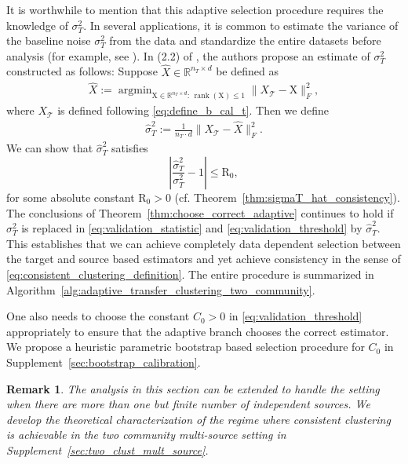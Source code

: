 \documentclass[10pt]{article}
\newtheorem{remark}{Remark}
\newcommand{\R}{\mathbb R}
\newcommand{\wh}{\widehat}
\DeclareMathOperator{\argmin}{\arg\min}
\newcommand{\calT}{\mathcal T}
\newcommand{\trg}{T}
\newcommand{\nT}{n_{\trg}}
\newcommand{\sigmaT}{\sigma_{\trg}}
\begin{document}
It is worthwhile to mention that this adaptive selection procedure requires the knowledge of $\sigmaT^2$. In several applications, it is common to estimate the variance of the baseline noise $\sigmaT^2$ from the data and standardize the entire datasets before analysis (for example, see \cite{zhong2022empirical}). In (2.2) of \citet{zhong2022empirical}, the authors propose an estimate of $\sigmaT^2$ constructed as follows: Suppose $\wh{X} \in \R^{\nT \times d}$ be defined as
\begin{align}
    \wh{X}:=\argmin_{\mathrm X \in \R^{\nT \times d}:\,\operatorname{rank}(\mathrm X) \le 1}\|X_\calT-\mathrm X\|^2_F,
\end{align}
where $X_\calT$ is defined following \eqref{eq:define_b_cal_t}. Then we define
\begin{align}
\label{eq:consistent_plug_in}
        \wh \sigma^2_T:=\frac{1}{\nT \cdot d}\|X_\calT-\wh{X}\|^2_F.
\end{align}
We can show that $\wh \sigma^2_T$ satisfies
\begin{equation}
\label{eq:consistency_sigma}
    \left|\frac{\wh \sigma^2_T}{\sigmaT^2}-1\right| \le \mathrm R_0,
\end{equation}
for some absolute constant $\mathrm R_0>0$ (cf. Theorem~\ref{thm:sigmaT_hat_consistency}). The conclusions of Theorem~\ref{thm:choose_correct_adaptive} continues to hold if $\sigmaT^2$ is replaced in \eqref{eq:validation_statistic} and \eqref{eq:validation_threshold} by $\wh \sigma^2_T$.
This establishes that we can achieve completely data dependent selection between the target and source based estimators and yet achieve consistency in the sense of \eqref{eq:consistent_clustering_definition}. The entire procedure is summarized in Algorithm~\ref{alg:adaptive_transfer_clustering_two_community}.
    
One also needs to choose the constant $C_0>0$ in \eqref{eq:validation_threshold} appropriately to ensure that the adaptive branch chooses the correct estimator. We propose a heuristic parametric bootstrap based selection procedure for $C_0$ in Supplement~\ref{sec:bootstrap_calibration}.  

\begin{remark}
    The analysis in this section can be extended to handle the setting when there are more than one but finite number of independent sources. We develop the theoretical characterization of the regime where consistent clustering is achievable in the two community multi-source setting in Supplement~\ref{sec:two_clust_mult_source}.
\end{remark}
\end{document}
